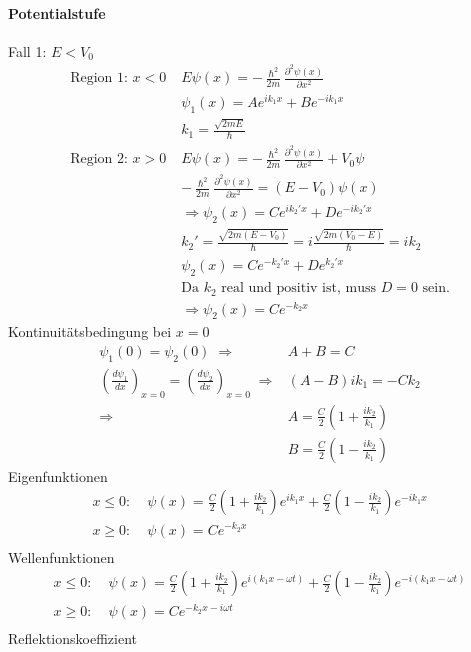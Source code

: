 \documentclass[10pt,a4paper]{article}
\begin{document}
\paragraph{Potentialstufe}$\,$\\
Fall 1: $E<V_0$
\begin{align}
\text{Region 1: }x<0 \;&E\psi(x)= -\frac{\hslash^2}{2m}\frac{\partial^2\psi(x)}{\partial x^2}\\
&\psi_1(x)=Ae^{ik_1x}+Be^{-ik_1x}\\
&k_1=\frac{\sqrt{2mE}}{\hslash}\\
\text{Region 2: }x>0 \;&E\psi(x)= -\frac{\hslash^2}{2m}\frac{\partial^2\psi(x)}{\partial x^2}+V_0\psi\\
& -\frac{\hslash^2}{2m}\frac{\partial^2\psi(x)}{\partial x^2} = (E-V_0)\psi(x)\\
&\Rightarrow \psi_2(x)=Ce^{ik_2'x}+De^{-ik_2'x}\\
&k_2'=\frac{\sqrt{2m(E-V_0)}}{\hslash}=i\frac{\sqrt{2m(V_0-E)}}{\hslash} =ik_2\\
&\psi_2(x)=Ce^{-k_2'x}+De^{k_2'x}\\
&\text{Da $k_2$ real und positiv ist, muss $D=0$ sein.}\\
&\Rightarrow \psi_2(x)=Ce^{-k_2x}
\end{align}
Kontinuitätsbedingung bei $x=0$\\
\begin{align}
\psi_1(0)=\psi_2(0) \;\Rightarrow &A+B = C\\
(\frac{d\psi_1}{dx})_{x=0}=(\frac{d\psi_2}{dx})_{x=0}\;\Rightarrow &(A-B)ik_1= -Ck_2\\
\Rightarrow &A= \frac{C}{2}(1+\frac{ik_2}{k_1})\\
&B= \frac{C}{2}(1-\frac{ik_2}{k_1})
\end{align}
Eigenfunktionen
\begin{align}
x\leq 0:\;& \psi(x)=\frac{C}{2}(1+\frac{ik_2}{k_1})e^{ik_1x}+\frac{C}{2}(1-\frac{ik_2}{k_1})e^{-ik_1x}\\
x\geq 0:\;& \psi(x)=Ce^{-k_2x}\\
\end{align}
Wellenfunktionen
\begin{align}
x\leq 0:\;& \psi(x)=\frac{C}{2}(1+\frac{ik_2}{k_1})e^{i(k_1x -\omega t)}+\frac{C}{2}(1-\frac{ik_2}{k_1})e^{-i(k_1x-\omega t)}\\
x\geq 0:\;& \psi(x)=Ce^{-k_2x-i\omega t}\\
\end{align}
Reflektionskoeffizient$\;$\\
\end{document}
